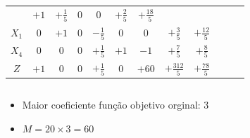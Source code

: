 \begin{frame}
{\begin{table}
\begin{tabular}{c c c c c c c c c c c c}
				& \cellcolor{yellow!50} $\scriptstyle +1$
				& \cellcolor{yellow!50} $\scriptstyle +\frac{1}{5}$
				& \cellcolor{yellow!50} $\scriptstyle 0$
				& \cellcolor{yellow!50} $\scriptstyle 0$
				& \cellcolor{yellow!50} $\scriptstyle +\frac{2}{5}$
				& \cellcolor{yellow!50} $\scriptstyle +\frac{18}{5}$ \\
			    \cellcolor{blue!100} \color{red} $\scriptstyle X_1$
				& \cellcolor{yellow!50} $\scriptstyle 0$
				& \cellcolor{yellow!50} $\scriptstyle +1$
				& \cellcolor{yellow!50} $\scriptstyle 0$
				& \cellcolor{yellow!50} $\scriptstyle -\frac{1}{5}$			
				& \cellcolor{yellow!50} $\scriptstyle 0$
				& \cellcolor{yellow!50} $\scriptstyle 0$
				& \cellcolor{yellow!50} $\scriptstyle +\frac{3}{5}$ 
				& \cellcolor{yellow!50} $\scriptstyle +\frac{12}{5}$  \\
				\cellcolor{blue!100} \color{red} $\scriptstyle X_4$
				& \cellcolor{yellow!50} $\scriptstyle 0$
				& \cellcolor{yellow!50} $\scriptstyle 0$
				& \cellcolor{yellow!50} $\scriptstyle 0$
				& \cellcolor{yellow!50} $\scriptstyle +\frac{1}{5}$
				& \cellcolor{yellow!50} $\scriptstyle +1$
				& \cellcolor{yellow!50} $\scriptstyle -1$
				& \cellcolor{yellow!50} $\scriptstyle +\frac{7}{5}$
				& \cellcolor{yellow!50} $\scriptstyle +\frac{8}{5}$ \\
				\cellcolor{blue!100} \color{white} $\scriptstyle Z$
				& \cellcolor{yellow!50} $\scriptstyle +1$
				& \cellcolor{yellow!50} $\scriptstyle 0$
				& \cellcolor{yellow!50} $\scriptstyle 0$
				& \cellcolor{yellow!50} $\scriptstyle +\frac{1}{5}$
				& \cellcolor{yellow!50} $\scriptstyle 0$
				& \cellcolor{yellow!50} $\scriptstyle +60$
				& \cellcolor{yellow!50} $\scriptstyle +\frac{312}{5}$ 
				& \cellcolor{yellow!50} $\scriptstyle +\frac{78}{5}$  \\
			\end{tabular}
		\end{table}			
	}
	
	

	{
		\begin{columns}
			\begin{column}{5cm}
				\begin{itemize}
				\item Maior coeficiente função objetivo orginal: 3
				\item $ M = 20 \times 3 = 60$
				\end{itemize}
			\end{column}
			\begin{column}{5cm}


\end{column}
\end{columns}}
\end{frame}
